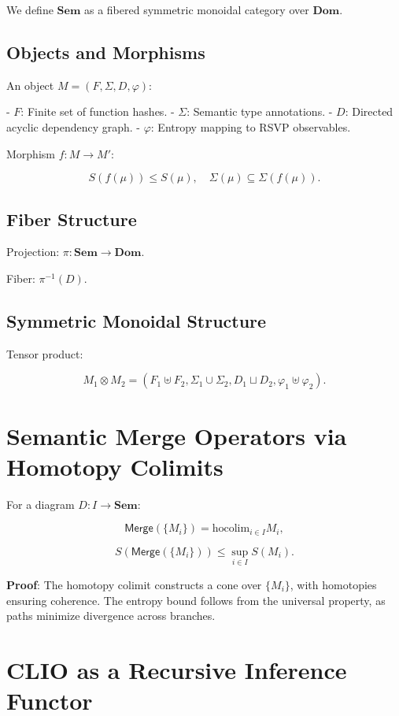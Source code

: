 \documentclass[12pt]{article}
\begin{document}
We define $ \mathbf{Sem} $ as a fibered symmetric monoidal category over $ \mathbf{Dom} $.

\subsection{Objects and Morphisms}

An object $ M = (F, \Sigma, D, \varphi) $:

- $ F $: Finite set of function hashes.
- $ \Sigma $: Semantic type annotations.
- $ D $: Directed acyclic dependency graph.
- $ \varphi $: Entropy mapping to RSVP observables.

Morphism $ f: M \to M' $:

\[ S(f(\mu)) \leq S(\mu), \quad \Sigma(\mu) \subseteq \Sigma(f(\mu)). \]

\subsection{Fiber Structure}

Projection: $ \pi: \mathbf{Sem} \to \mathbf{Dom} $.

Fiber: $ \pi^{-1}(D) $.

\subsection{Symmetric Monoidal Structure}

Tensor product:

\[ M_1 \otimes M_2 = (F_1 \uplus F_2, \Sigma_1 \cup \Sigma_2, D_1 \sqcup D_2, \varphi_1 \uplus \varphi_2). \]

\section{Semantic Merge Operators via Homotopy Colimits}
\label{app:merge-operators}

For a diagram $ D: I \to \mathbf{Sem} $:

\[ \mathsf{Merge}(\{M_i\}) = \mathrm{hocolim}_{i \in I} M_i, \]

\[ S(\mathsf{Merge}(\{M_i\})) \leq \sup_{i \in I} S(M_i). \]

\textbf{Proof}: The homotopy colimit constructs a cone over $ \{M_i\} $, with homotopies ensuring coherence. The entropy bound follows from the universal property, as paths minimize divergence across branches.

\section{CLIO as a Recursive Inference Functor}
\label{app:clio-functor}
\end{document}
